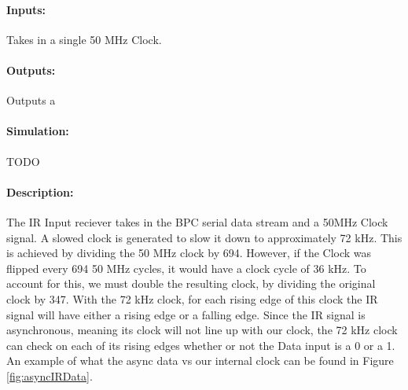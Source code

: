 \documentclass[]{article}
\begin{document}
\paragraph{Inputs:} Takes in a single 50 MHz Clock.
\paragraph{Outputs:} Outputs a 
\paragraph{Simulation:} TODO 
\paragraph{Description:} The IR Input reciever takes in the BPC serial data stream and a 50MHz Clock signal. A slowed clock is generated to slow it down to approximately 72 kHz.
This is achieved by dividing the 50 MHz clock by 694. However, if the Clock was flipped every 694 50 MHz cycles, it would have a clock cycle of 36 kHz. 
To account for this, we must double the resulting clock, by dividing the original clock by 347.
With the 72 kHz clock, for each rising edge of this clock the IR signal will have either a rising edge or a falling edge. 
Since the IR signal is asynchronous, meaning its clock will not line up with our clock, the 72 kHz clock can check on each of its rising edges whether or not the Data input is a 0 or a 1.
An example of what the async data vs our internal clock can be found in Figure \ref{fig:asyncIRData}.
\end{document}
